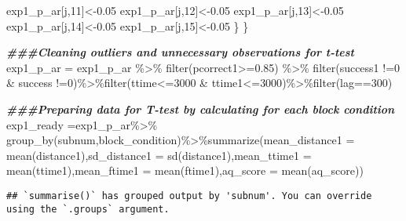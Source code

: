 \documentclass[
]{article}
\newenvironment{Shaded}{\begin{snugshade}}{\end{snugshade}}
\newcommand{\AttributeTok}[1]{\textcolor[rgb]{0.77,0.63,0.00}{#1}}
\newcommand{\DecValTok}[1]{\textcolor[rgb]{0.00,0.00,0.81}{#1}}
\newcommand{\DocumentationTok}[1]{\textcolor[rgb]{0.56,0.35,0.01}{\textbf{\textit{#1}}}}
\newcommand{\FloatTok}[1]{\textcolor[rgb]{0.00,0.00,0.81}{#1}}
\newcommand{\FunctionTok}[1]{\textcolor[rgb]{0.00,0.00,0.00}{#1}}
\newcommand{\NormalTok}[1]{#1}
\newcommand{\OtherTok}[1]{\textcolor[rgb]{0.56,0.35,0.01}{#1}}
\newcommand{\SpecialCharTok}[1]{\textcolor[rgb]{0.00,0.00,0.00}{#1}}
\begin{document}
\begin{Shaded}
\begin{Highlighting}[]
\NormalTok{    exp1\_p\_ar[j,}\DecValTok{11}\NormalTok{]}\OtherTok{\textless{}{-}}\FloatTok{0.05}
\NormalTok{    exp1\_p\_ar[j,}\DecValTok{12}\NormalTok{]}\OtherTok{\textless{}{-}}\FloatTok{0.05}
\NormalTok{    exp1\_p\_ar[j,}\DecValTok{13}\NormalTok{]}\OtherTok{\textless{}{-}}\FloatTok{0.05}
\NormalTok{    exp1\_p\_ar[j,}\DecValTok{14}\NormalTok{]}\OtherTok{\textless{}{-}}\FloatTok{0.05}
\NormalTok{    exp1\_p\_ar[j,}\DecValTok{15}\NormalTok{]}\OtherTok{\textless{}{-}}\FloatTok{0.05}
\NormalTok{  \}}
\NormalTok{\}}

\DocumentationTok{\#\#\#Cleaning outliers and unnecessary observations for t{-}test}
\NormalTok{exp1\_p\_ar }\OtherTok{=}\NormalTok{ exp1\_p\_ar }\SpecialCharTok{\%\textgreater{}\%} \FunctionTok{filter}\NormalTok{(pcorrect1}\SpecialCharTok{\textgreater{}=}\FloatTok{0.85}\NormalTok{) }\SpecialCharTok{\%\textgreater{}\%} \FunctionTok{filter}\NormalTok{(success1 }\SpecialCharTok{!=}\DecValTok{0} \SpecialCharTok{\&}\NormalTok{ success }\SpecialCharTok{!=}\DecValTok{0}\NormalTok{)}\SpecialCharTok{\%\textgreater{}\%}\FunctionTok{filter}\NormalTok{(ttime}\SpecialCharTok{\textless{}=}\DecValTok{3000} \SpecialCharTok{\&}\NormalTok{ ttime1}\SpecialCharTok{\textless{}=}\DecValTok{3000}\NormalTok{)}\SpecialCharTok{\%\textgreater{}\%}\FunctionTok{filter}\NormalTok{(lag}\SpecialCharTok{==}\DecValTok{300}\NormalTok{)}

\DocumentationTok{\#\#\#Preparing data for T{-}test by calculating for each block condition}
\NormalTok{exp1\_ready }\OtherTok{=}\NormalTok{exp1\_p\_ar}\SpecialCharTok{\%\textgreater{}\%} \FunctionTok{group\_by}\NormalTok{(subnum,block\_condition)}\SpecialCharTok{\%\textgreater{}\%}\FunctionTok{summarize}\NormalTok{(}\AttributeTok{mean\_distance1 =} \FunctionTok{mean}\NormalTok{(distance1),}\AttributeTok{sd\_distance1 =} \FunctionTok{sd}\NormalTok{(distance1),}\AttributeTok{mean\_ttime1 =} \FunctionTok{mean}\NormalTok{(ttime1),}\AttributeTok{mean\_ftime1 =} \FunctionTok{mean}\NormalTok{(ftime1),}\AttributeTok{aq\_score =} \FunctionTok{mean}\NormalTok{(aq\_score))}
\end{Highlighting}
\end{Shaded}

\begin{verbatim}
## `summarise()` has grouped output by 'subnum'. You can override using the `.groups` argument.
\end{verbatim}
\end{document}

